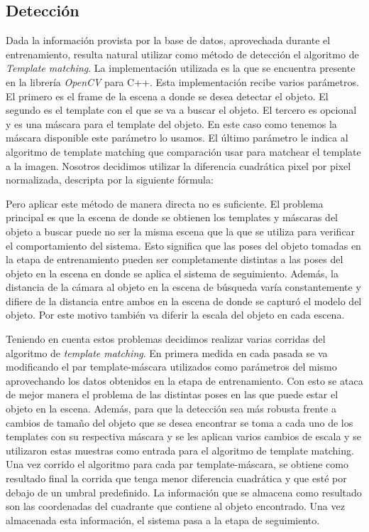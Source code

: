 \subsection{Detección}\label{deteccion_rgb}
Dada la información provista por la base de datos, aprovechada durante el entrenamiento, resulta natural utilizar como método de detección el algoritmo de \textit{Template matching}.  La implementación utilizada es la que se encuentra presente en la librería \textit{OpenCV} para C++. Esta implementación recibe varios parámetros. El primero es el frame de la escena a donde se desea detectar el objeto. El segundo es el template con el que se va a buscar el objeto. El tercero es opcional y es una máscara para el template del objeto. En este caso como tenemos la máscara disponible este parámetro lo usamos. El último parámetro le indica al algoritmo de template matching que comparación usar para matchear el template a la imagen. Nosotros decidimos utilizar la diferencia cuadrática pixel por pixel normalizada, descripta por la siguiente fórmula:


Pero aplicar este método de manera directa no es suficiente. El problema principal es que la escena de donde se obtienen los templates y máscaras del objeto a buscar puede no ser la misma escena que la que se utiliza para verificar el comportamiento del sistema. Esto significa que las poses del objeto tomadas en la etapa de entrenamiento pueden ser completamente distintas a las poses del objeto en la escena en donde se aplica el sistema de seguimiento. Además, la distancia de la cámara al objeto en la escena de búsqueda varía constantemente y difiere de la distancia entre ambos en la escena de donde se capturó el modelo del objeto. Por este motivo también va diferir la escala del objeto en cada escena.

Teniendo en cuenta estos problemas decidimos realizar varias corridas del algoritmo de \textit{template matching}. En primera medida en cada pasada se va modificando el par template-máscara utilizados como parámetros del mismo aprovechando los datos obtenidos en la etapa de entrenamiento. Con esto se ataca de mejor manera el problema de las distintas poses en las que puede estar el objeto en la escena. Además, para que la detección sea más robusta frente a cambios de tamaño del objeto que se desea encontrar se toma a cada uno de los templates con su respectiva máscara y se les aplican varios cambios de escala y se utilizaron estas muestras como entrada para el algoritmo de template matching. Una vez corrido el algoritmo para cada par template-máscara, se obtiene como resultado final la corrida que tenga menor diferencia cuadrática y que esté por debajo de un umbral predefinido. La información que se almacena como resultado son las coordenadas del cuadrante que contiene al objeto encontrado. Una vez almacenada esta información, el sistema pasa a la etapa de seguimiento.

